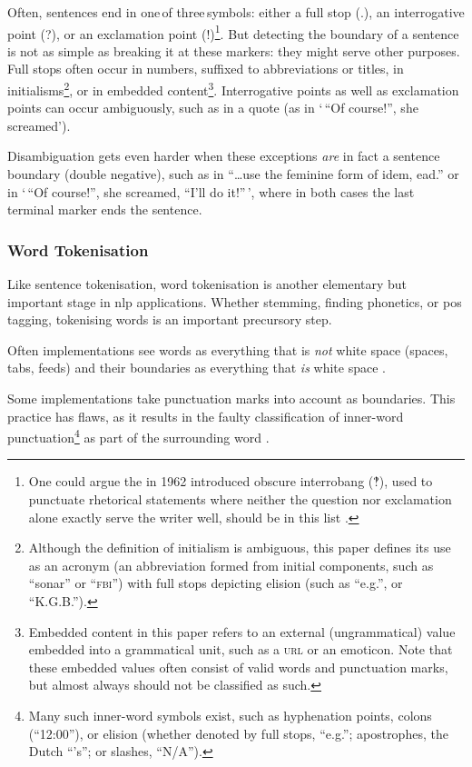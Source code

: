 Often, sentences end in one\,of three\,symbols: either a full stop (.),
  an interrogative point (?), or an exclamation point (!)\footnote{One
    could argue the in 1962 introduced
    obscure interrobang (‽), used to punctuate rhetorical statements where
    neither the question nor exclamation alone exactly serve the writer
    well, should be in this list \autocite{interrobang-mks.com}.}.
But detecting the boundary of a sentence is not as simple as breaking it at
  these markers: they might serve other purposes.
Full stops often occur in numbers, suffixed to abbreviations or titles,
  in initialisms\footnote{Although
    the definition of initialism is ambiguous, this paper defines its use
    as an acronym (an abbreviation formed from initial components, such as
    ``sonar'' or ``\textsc{fbi}'') with full stops depicting elision (such as
    ``e.g.'', or ``K.G.B.'').},
  or in embedded content\footnote{Embedded
      content in this paper refers to an external (ungrammatical) value
      embedded into a grammatical unit, such as a \textsc{url} or an emoticon.
    Note that these embedded values often consist of valid words and
      punctuation marks, but almost always should not be classified as such.}.
Interrogative points as well as exclamation points can occur ambiguously,
  such as in a quote (as in `\,``Of course!'', she screamed').

Disambiguation gets even harder when these exceptions \emph{are} in fact a
  sentence boundary (double negative), such as in
  ``\ldots{}use the feminine form of idem, ead.'' or in
  `\,``Of course!'', she screamed, ``I'll do it!''\,', where in both
  cases the last terminal marker ends the sentence.

\subsubsection{Word Tokenisation}\label{word-tokenisation}

Like sentence tokenisation, word tokenisation is another elementary but
important stage in \gls{nlp} applications. Whether stemming, finding
phonetics, or \gls{pos} tagging, tokenising words is an important
precursory step.

Often implementations see words as everything that is \emph{not} white
  space (spaces, tabs, feeds) and their boundaries as everything that
  \emph{is} white space \autocite{loadfive/knwl-source-code}.

Some implementations take punctuation marks into account as boundaries.
This practice has flaws, as it results in the faulty classification of
  inner-word punctuation\footnote{Many such inner-word symbols exist, such
    as hyphenation points, colons (``12:00''), or elision (whether denoted
    by full stops, ``e.g.''; apostrophes, the Dutch ``'s''; or slashes,
    ``N/A'').}
  as part of the surrounding word \autocite{NaturalNode/natural-source-code}.

